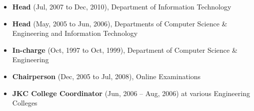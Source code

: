\begin{enumerate}
\begin{itemize}
\item
\textbf{Head} (Jul, 2007 to Dec, 2010), Department of Information Technology 

\item
\textbf{Head} (May, 2005 to Jun, 2006), Departments of Computer Science \& Engineering and Information Technology

\item
\textbf{In-charge} (Oct, 1997 to Oct, 1999), Department of Computer Science \& Engineering

\item
\textbf{Chairperson} (Dec, 2005 to Jul, 2008), Online Examinations

\item
\textbf{JKC College Coordinator} (Jun, 2006 – Aug, 2006) at various Engineering Colleges
\end{itemize}

	

\end{enumerate}